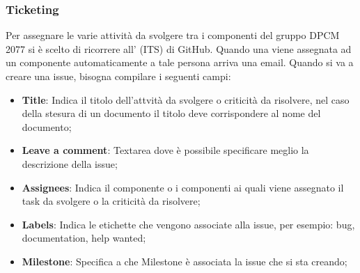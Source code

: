\subsubsection{Ticketing}
Per assegnare le varie attività da svolgere tra i componenti del gruppo DPCM 2077 si è scelto di ricorrere all' (ITS) di GitHub.
Quando una  viene assegnata ad un componente automaticamente a tale persona arriva una email.
Quando si va a creare una issue, bisogna compilare i seguenti campi:
\begin{itemize}
\item{\textbf{Title}: Indica il titolo dell'attvità da svolgere o criticità da risolvere, nel caso della stesura di un documento il titolo deve corrispondere al nome del documento;}
\item{\textbf{Leave a comment}: Textarea dove è possibile specificare meglio la descrizione della issue;}
\item{\textbf{Assignees}: Indica il componente o i componenti ai quali viene assegnato il task da svolgere o la criticità da risolvere;}
\item{\textbf{Labels}: Indica le etichette che vengono associate alla issue, per esempio: bug, documentation, help wanted;}
\item{\textbf{Milestone}: Specifica a che Milestone è associata la issue che si sta creando;}
\end{itemize} 

